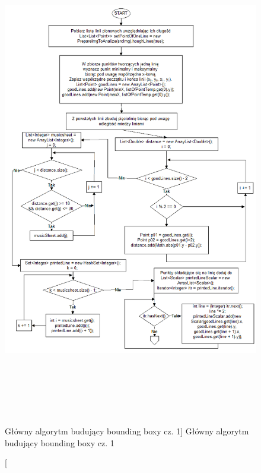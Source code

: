 \documentclass[a4paper,12pt]{article}
\begin{document}
			\begin{figure}[!ht]  
			    \begin{center}
				    \includegraphics[height=21cm]{image//algorithm//majorProcesing_01.png} 
			    \end{center}
			    \caption
    			    [Główny algorytm budujący bounding boxy cz. 1]  
    			    {Główny algorytm budujący bounding boxy cz. 1}  
    			    \label{fig:boundingBox01}
		    \end{figure}
			
			\newpage
			
\end{document}
